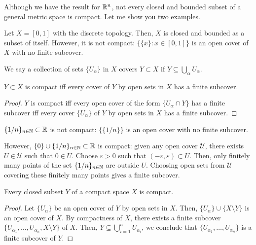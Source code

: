 Although we have the result for $\mathbb{R}^n$, not every closed and bounded subset of a general metric space is compact. Let me show you two examples.

\begin{example}
    Let $X=[0,1]$ with the discrete topology. Then, $X$ is closed and bounded as a subset of itself. However, it is not compact: $\{\{x\}:x\in[0,1]\}$ is an open cover of $X$ with no finite subcover.
\end{example}




We say a collection of sets $\{U_\alpha\}$ in $X$ covers $Y\subset X$ if $Y\subseteq \bigcup_\alpha U_\alpha$.

\begin{lemma}
    $Y\subset X$ is compact iff every cover of $Y$ by open sets in $X$ has a finite subcover.
\end{lemma}

\begin{proof}
    $Y$ is compact iff every open cover of the form $\{U_\alpha\cap Y\}$ has a finite subcover iff every cover $\{U_\alpha\}$ of $Y$ by open sets in $X$ has a finite subcover.
\end{proof}


\begin{example}
    $\{1/n\}_{n\in \mathbb{N}}\subset \mathbb{R}$ is not compact: $\{\{1/n\}\}$ is an open cover with no finite subcover.

    However, $\{0\}\cup \{1/n\}_{n\in\mathbb{N}}\subset\mathbb{R}$ is compact: given any open cover $\mathcal{U}$, there exists $U\in\mathcal{U}$ such that $0\in U$. Choose $\varepsilon>0$ such that $(-\varepsilon,\varepsilon)\subset U$. Then, only finitely many points of the set $\{1/n\}_{n\in\mathbb{N}}$ are outside $U$. Choosing open sets from $\mathcal{U}$ covering these finitely many points gives a finite subcover.
\end{example}


\begin{theorem}
    Every closed subset $Y$ of a compact space $X$ is compact.
\end{theorem}

\begin{proof}
    Let $\{U_\alpha\}$ be an open cover of $Y$ by open sets in $X$. Then, $\{U_\alpha\}\cup \{X\setminus Y\}$ is an open cover of $X$. By compactness of $X$, there exists a finite subcover $\{U_{\alpha_1},\ldots,U_{\alpha_n},X\setminus Y\}$ of $X$. Then, $Y\subseteq \bigcup_{i=1}^n U_{\alpha_i}$, we conclude that $\{U_{\alpha_1},\ldots,U_{\alpha_n}\}$ is a finite subcover of $Y$.
\end{proof}

